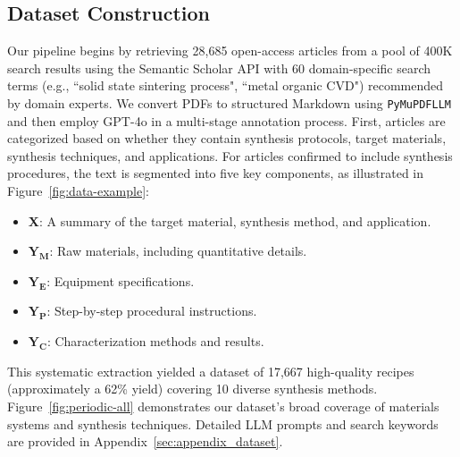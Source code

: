 \subsection{Dataset Construction}
Our pipeline begins by retrieving 28,685 open-access articles from a pool of 400K search results using the Semantic Scholar API with 60 domain-specific search terms (e.g., ``solid state sintering process", ``metal organic CVD") recommended by domain experts. We convert PDFs to structured Markdown using \texttt{PyMuPDFLLM}~\cite{pymupdf4llm2024} and then employ GPT-4o in a multi-stage annotation process. First, articles are categorized based on whether they contain synthesis protocols, target materials, synthesis techniques, and applications. For articles confirmed to include synthesis procedures, the text is segmented into five key components, as illustrated in Figure~\ref{fig:data-example}:

\begin{itemize}
    \item \textbf{X}: A summary of the target material, synthesis method, and application.
    \item \(\mathbf{Y_M}\): Raw materials, including quantitative details.
    \item \(\mathbf{Y_E}\): Equipment specifications.
    \item \(\mathbf{Y_P}\): Step-by-step procedural instructions.
    \item \(\mathbf{Y_C}\): Characterization methods and results.
\end{itemize}

This systematic extraction yielded a dataset of 17,667 high-quality recipes (approximately a 62\% yield) covering 10 diverse synthesis methods. Figure~\ref{fig:periodic-all} demonstrates our dataset's broad coverage of materials systems and synthesis techniques. Detailed LLM prompts and search keywords are provided in Appendix~\ref{sec:appendix_dataset}.




